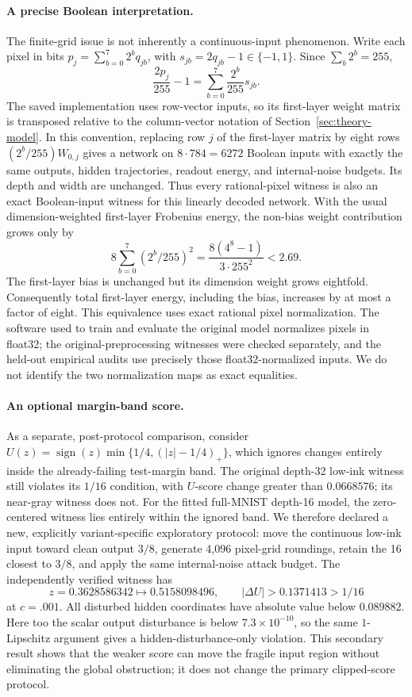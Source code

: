 \paragraph{A precise Boolean interpretation.}
The finite-grid issue is not inherently a continuous-input phenomenon.  Write each pixel in bits $p_j=\sum_{b=0}^7 2^b q_{jb}$, with $s_{jb}=2q_{jb}-1\in\{-1,1\}$.  Since $\sum_b2^b=255$,
\[
 \frac{2p_j}{255}-1=\sum_{b=0}^7\frac{2^b}{255}s_{jb}.
\]
The saved implementation uses row-vector inputs, so its first-layer
weight matrix is transposed relative to the column-vector notation of
Section~\ref{sec:theory-model}. In this convention, replacing row $j$
of the first-layer matrix by eight rows $(2^b/255)W_{0,j}$ gives a network on $8\cdot784=6272$ Boolean inputs with exactly the same outputs, hidden trajectories, readout energy, and internal-noise budgets.  Its depth and width are unchanged.  Thus every rational-pixel witness is also an exact Boolean-input witness for this linearly decoded network.  With the usual dimension-weighted first-layer Frobenius energy, the non-bias weight contribution grows only by
\[
 8\sum_{b=0}^7(2^b/255)^2
 =\frac{8(4^8-1)}{3\cdot255^2}<2.69.
\]
The first-layer bias is unchanged but its dimension weight grows eightfold.  Consequently total first-layer energy, including the bias, increases by at most a factor of eight.
This equivalence uses exact rational pixel normalization.  The software used to train and evaluate the original model normalizes pixels in float32; the original-preprocessing witnesses were checked separately, and the held-out empirical audits use precisely those float32-normalized inputs.  We do not identify the two normalization maps as exact equalities.

\paragraph{An optional margin-band score.}
As a separate, post-protocol comparison, consider
$U(z)=\operatorname{sign}(z)\min\{1/4,(|z|-1/4)_+\}$, which ignores changes entirely inside the already-failing test-margin band.  The original depth-32 low-ink witness still violates its $1/16$ condition, with $U$-score change greater than $0.0668576$; its near-gray witness does not.  For the fitted full-MNIST depth-16 model, the zero-centered witness lies entirely within the ignored band.  We therefore declared a new, explicitly variant-specific exploratory protocol: move the continuous low-ink input toward clean output $3/8$, generate 4,096 pixel-grid roundings, retain the 16 closest to $3/8$, and apply the same internal-noise attack budget.  The independently verified witness has
\[
 z=0.3628586342\longmapsto0.5158098496,
 \qquad |\Delta U|>0.1371413>1/16
\]
at $c=.001$.  All disturbed hidden coordinates have absolute value below $0.089882$.  Here too the scalar output disturbance is below $7.3\times10^{-10}$, so the same $1$-Lipschitz argument gives a hidden-disturbance-only violation.  This secondary result shows that the weaker score can move the fragile input region without eliminating the global obstruction; it does not change the primary clipped-score protocol.

